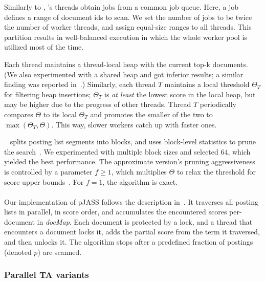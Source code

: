 {Similarly to \alg, \pBMW's threads obtain jobs from a common job queue. Here, a job defines a range of document ids to scan. 
We set the number of jobs to be twice the number of worker threads, and assign equal-size ranges to all threads.  
This partition results in well-balanced execution in which the whole worker pool is utilized 
most of the time. 

Each thread maintains a thread-local heap with the current top-k documents. (We also experimented with a shared heap and 
got inferior results; a similar finding was reported in~\cite{rojas2013distributing}.)
Similarly, each thread $T$ maintains a local threshold $\Theta_T$ for filtering heap insertions; 
$\Theta_T$ is \emph{at least} the lowest score in the local heap, but may be higher due to the progress of other threads.  
Thread $T$ periodically compares $\Theta$ to its local $\Theta_T$ and promotes the smaller of the two to $\max(\Theta_T, \Theta)$. 
This way,  slower workers catch up with  faster ones.

\pBMW\
splits posting list segments into blocks, and uses block-level
statistics to prune the search~\cite{Ding:2011}. We experimented with multiple block sizes and selected $64$, 
which yielded the best performance.
The approximate version's pruning aggressiveness is  controlled by  a parameter 
$f \geq 1$, which multiplies $\Theta$ to relax the threshold for score upper bounds~\cite{Broder:2003}. For $f=1$, the algorithm is exact.

\paragraph{\pJASS}
Our implementation of pJASS  follows the description in~\cite{parallel-jass}. It traverses all posting lists in parallel, in score order, and accumulates the encountered scores 
per-document in  \emph{docMap}. Each document is protected by a lock, and a thread that encounters a document locks it, adds the partial score from the term it traversed, and then unlocks it.
The algorithm stops after a predefined fraction of postings (denoted $p$) are scanned.

\subsubsection{Parallel TA variants}

}
